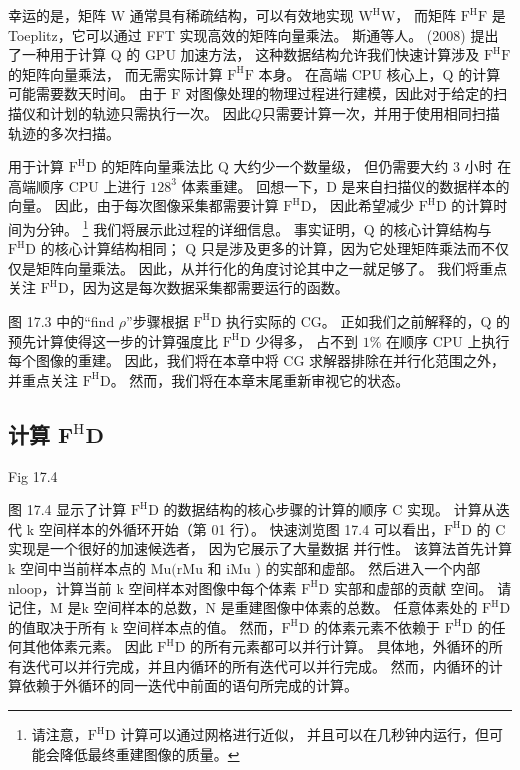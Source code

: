 幸运的是，矩阵 $\mathrm{W}$ 通常具有稀疏结构，可以有效地实现 $\mathrm{W}^{\mathrm{H}} \mathrm{W}$，
而矩阵 $\mathrm{F }^{\mathrm{H}} \mathrm{F}$ 是 Toeplitz，它可以通过 FFT 实现高效的矩阵向量乘法。 
斯通等人。 (2008) 提出了一种用于计算 Q 的 GPU 加速方法，
这种数据结构允许我们快速计算涉及 $\mathrm{F}^{\mathrm{H}} \mathrm{F}$ 的矩阵向量乘法，
而无需实际计算 $\mathrm{F}^{\mathrm{H}} \mathrm{F}$ 本身。 
在高端 CPU 核心上，$\mathrm{Q}$ 的计算可能需要数天时间。 
由于 $\mathrm{F}$ 对图像处理的物理过程进行建模，因此对于给定的扫描仪和计划的轨迹只需执行一次。 
因此$Q$只需要计算一次，并用于使用相同扫描轨迹的多次扫描。

用于计算 $\mathrm{F}^{\mathrm{H}} \mathrm{D}$ 的矩阵向量乘法比 $\mathrm{Q}$ 大约少一个数量级，
但仍需要大约 3 小时 在高端顺序 CPU 上进行 $128^{3}$ 体素重建。 回想一下，D 是来自扫描仪的数据样本的向量。 
因此，由于每次图像采集都需要计算 $\mathrm{F}^{\mathrm{H}} \mathrm{D}$，
因此希望减少 $\mathrm{F}^{\mathrm{H}} \mathrm{D}$ 的计算时间为分钟。 
\footnote{请注意，$\mathrm{F}^{\mathrm{H}} \mathrm{D}$ 计算可以通过网格进行近似，
并且可以在几秒钟内运行，但可能会降低最终重建图像的质量。}
我们将展示此过程的详细信息。 
事实证明，$\mathrm{Q}$ 的核心计算结构与 $\mathrm{F}^{\mathrm{H}}\mathrm{D}$ 的核心计算结构相同； 
$\mathrm{Q}$ 只是涉及更多的计算，因为它处理矩阵乘法而不仅仅是矩阵向量乘法。 因此，从并行化的角度讨论其中之一就足够了。 
我们将重点关注 $\mathrm{F}^{\mathrm{H}} \mathrm{D}$，因为这是每次数据采集都需要运行的函数。

图 17.3 中的“find $\rho$”步骤根据 $\mathrm{F}^{\mathrm{H}} \mathrm{D}$ 执行实际的 CG。 
正如我们之前解释的，$\mathrm{Q}$ 的预先计算使得这一步的计算强度比 $\mathrm{F}^{\mathrm{H}} \mathrm{D}$ 少得多，
占不到 $1 \% $ 在顺序 CPU 上执行每个图像的重建。 
因此，我们将在本章中将 CG 求解器排除在并行化范围之外，并重点关注 $\mathrm{F}^{\mathrm{H}} \mathrm{D}$。 
然而，我们将在本章末尾重新审视它的状态。

\subsection{计算 $\mathbf{F}^{\mathrm{H}} \mathbf{D}$}
{\color{red} Fig 17.4}

图 17.4 显示了计算 $\mathrm{F}^{\mathrm{H}} \mathrm{D}$ 的数据结构的核心步骤的计算的顺序 $\mathrm{C}$ 实现。 
计算从迭代 k 空间样本的外循环开始（第 01 行）。 
快速浏览图 17.4 可以看出，$\mathrm{F}^{\mathrm{H}} \mathrm{D}$ 的 $\mathrm{C}$ 实现是一个很好的加速候选者，
因为它展示了大量数据 并行性。 
该算法首先计算 k 空间中当前样本点的 $\mathrm{Mu}(\mathrm{rMu}$ 和 $\mathrm{iMu}$ ) 的实部和虚部。 
然后进入一个内部 nloop，计算当前 k 空间样本对图像中每个体素 $\mathrm{F}^{\mathrm{H}} \mathrm{D}$ 实部和虚部的贡献 空间。 
请记住，$\mathrm{M}$ 是$\mathrm{k}$ 空间样本的总数，$\mathrm{N}$ 是重建图像中体素的总数。 
任意体素处的 $\mathrm{F}^{\mathrm{H}} \mathrm{D}$ 的值取决于所有 $\mathrm{k}$ 空间样本点的值。 
然而，$\mathrm{F}^{\mathrm{H}} \mathrm{D}$ 的体素元素不依赖于 
$\mathrm{F}^{\mathrm{H}} \mathrm{D}$ 的任何其他体素元素。 
因此 $\mathrm{F}^{\mathrm{H}} \mathrm{D}$ 的所有元素都可以并行计算。 
具体地，外循环的所有迭代可以并行完成，并且内循环的所有迭代可以并行完成。 
然而，内循环的计算依赖于外循环的同一迭代中前面的语句所完成的计算。

